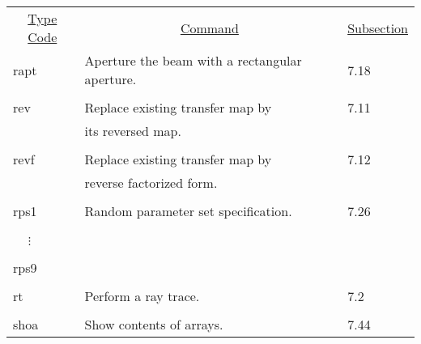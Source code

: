 \begin{center}
\begin{tabular}{lll}
\multicolumn{1}{c}{\underline{Type Code}} &
\multicolumn{1}{c}{\underline{Command}}   &
\multicolumn{1}{c}{\underline{Subsection}} \\
\hspace{1.5em}rapt  & Aperture the beam with a rectangular aperture.& \hspace{2em}7.18\\
\vspace{-3mm}& &\\
\hspace{1.5em}rev   &        Replace existing transfer map by      & \hspace{2em}7.11\\
                    & its reversed map.                            &\\
\vspace{-3mm}& &\\
\hspace{1.5em}revf  &         Replace existing transfer map by     & \hspace{2em}7.12\\
                    & reverse factorized form.                     &\\
\vspace{-3mm}& &\\
\hspace{1.5em}rps1  &         Random parameter set specification.  & \hspace{2em}7.26\\
\vspace{-7mm}& &\\
\hspace{1.5em}\ \ \,$\vdots$ & &\\
\vspace{-7mm}& &\\
\hspace{1.5em}rps9  & &\\
\vspace{-3mm}& &\\
\hspace{1.5em}rt    &        Perform a ray trace.                  & \hspace{2em}7.2\\
\vspace{-3mm}& &\\
\hspace{1.5em}shoa    &   Show contents of arrays.       &  \hspace{2em}7.44\\

\end{tabular}
\end{center}
